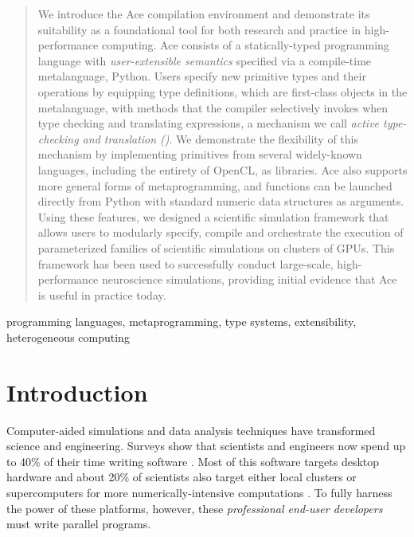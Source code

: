 \documentclass[10pt, conference, compsocconf]{IEEEtran}
\begin{document}
\begin{abstract}
We introduce the Ace compilation environment and demonstrate its suitability as a foundational tool for both research and practice in high-performance computing.
Ace consists of a statically-typed programming language with {\em user-extensible semantics} specified via a compile-time meta\-language, Python. Users specify new primitive types and their operations by equipping type definitions, which are first-class objects in the metalanguage, with  methods that the compiler selectively invokes when type checking and translating expressions, a mechanism we call {\em active type-checking and translation (\ATT)}. We demonstrate the flexibility of this mechanism by implementing primitives from several widely-known languages, including the entirety of OpenCL, as libraries. Ace also supports more general forms of metaprogramming, and functions can be launched directly from Python with standard numeric data structures as arguments. Using these features, we designed a scientific simulation framework that allows users to modularly specify, compile and orchestrate the execution of parameterized families of scientific simulations on clusters of GPUs. This framework has been used to successfully conduct large-scale, high-performance neuroscience simulations, providing initial evidence that Ace is useful in practice today.
\end{abstract}

\begin{IEEEkeywords}
programming languages, metaprogramming, type systems, extensibility, heterogeneous computing
\end{IEEEkeywords}


%
\IEEEpeerreviewmaketitle



\section{Introduction}

Computer-aided simulations and data analysis techniques have transformed science and engineering. Surveys show that scientists and engineers now spend up to 40\% of their time writing software \cite{howison2011scientific, hannay2009scientists}. Most of this software targets desktop hardware and about 20\% of scientists also target either local clusters or super\-computers for more numerically-intensive computations \cite{hannay2009scientists}. To fully harness the power of these platforms, however, these {\em professional end-user developers} \cite{segal2007some} must write parallel programs.
\end{document}

